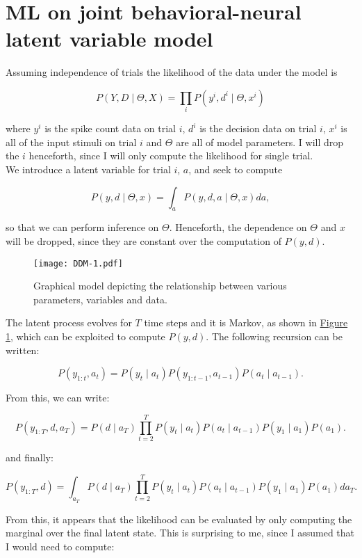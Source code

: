 \documentclass[12pt]{article}
\newcommand{\be}{\begin{equation}}
\newcommand{\ee}{\end{equation}}
\begin{document}
\section*{ML on joint behavioral-neural latent variable model}

Assuming independence of trials the likelihood of the data under the model is

\be
P(Y, D \mid \Theta, X) = \prod_{i} P(y^i, d^i \mid \Theta, x^i)
\ee

where $y^i$ is the spike count data on trial $i$, $d^i$ is the decision data on trial $i$, $x^i$ is all of the input stimuli on trial $i$ and $\Theta$ are all of model parameters. I will drop the $i$ henceforth, since I will only compute the likelihood for single trial.\\

We introduce a latent variable for trial $i$, $a$, and seek to compute

\be
P(y, d \mid  \Theta, x) = \int_{a} P(y, d, a \mid  \Theta, x) da,
\ee

so that we can perform inference on $\Theta$. Henceforth, the dependence on $\Theta$ and $x$ will be dropped, since they are constant over the computation of $P(y,d)$.

\begin{figure}[h!]

	\centerline {\texttt{[image: DDM-1.pdf]}}
	\caption{Graphical model depicting the relationship between various parameters, variables and data.}
	
	\label{fig:fig1}
	
\end{figure}

The latent process evolves for $T$ time steps and it is Markov, as shown in \hyperref[fig:fig1]{Figure \ref*{fig:fig1}}, which can be exploited to compute $P(y,d)$. The following recursion can be written:

\be
P(y_{1:t},a_{t}) = P(y_t \mid a_t) P(y_{1:t-1}, a_{t-1}) P(a_t \mid a_{t-1}).
\ee

From this, we can write:

\be
P(y_{1:T},d, a_{T}) = P(d \mid a_T) \prod_{t=2}^T P(y_t \mid a_t) P(a_t \mid a_{t-1}) P(y_1 \mid a_1) P(a_1).
\ee

and finally:

\be
\label{eq:posteriordata}
P(y_{1:T},d) = \int_{a_T} P(d \mid a_T) \prod_{t=2}^T P(y_t \mid a_t) P(a_t \mid a_{t-1}) P(y_1 \mid a_1) P(a_1) da_T.
\ee

From this, it appears that the likelihood can be evaluated by only computing the marginal over the final latent state. This is surprising to me, since I assumed that I would need to compute:
\end{document}
